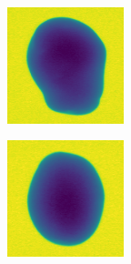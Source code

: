 \documentclass[11pt]{article}
\begin{document}
\begin{figure}[!h]
\begin{subfigure}[b]{0.22\textwidth}
         \caption{}
         \label{fig:perfect_23}
     \end{subfigure}
     \\
    \begin{subfigure}[b]{0.22\textwidth}
         \centering
         \includegraphics[width=\textwidth]{figurer/potato_dataset/perfect/perfect_24.jpg}
         \caption{}
         \label{fig:perfect_24}
     \end{subfigure}
     \hfill
     \begin{subfigure}[b]{0.22\textwidth}
         \centering
         \includegraphics[width=\textwidth]{figurer/potato_dataset/perfect/perfect_25.jpg}

\end{subfigure}
\end{figure}
\end{document}
